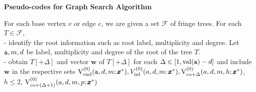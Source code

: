 \documentclass[12pt]{article}
\newcommand{\co}{\mathrm{co}}
\newcommand{\V}{{\rm V}}
\newcommand{\ta}{{\tt a}}
\newcommand{\w}{\pmb{w}}
\newcommand{\x}{\pmb{x}}
\newcommand{\1}{\pmb{1}}
\newcommand{\0}{\pmb{0}}
\newcommand{\val}{\mathrm{val}}
\newcommand{\inl}{\mathrm{inl}}
\newcommand{\en}{\mathrm{end}}
\begin{document}
  
 
\begin{center}
 {\Large\bf Pseudo-codes for Graph Search Algorithm}
\end{center} 
For each base vertex $v$ or edge $e$, we are given a set
$\mathcal{F}$ of fringe trees. 
For each $T \in \mathcal{F}$, \\
- identify the root information
such as root label, multiplicity and degree. 
Let $\ta, m, d$ be label, multiplicity and degree of the root of 
the tree $T$. \\
- obtain $T[+\Delta]$ and vector $\w$ of 
$T[+\Delta]$ 
for each $\Delta \in [1, \val(\ta) - d]$ and 
include $\w$ in the respective sets
$\V_{\en}^{(0)}(\ta, d, m; \x^*), V_{\inl}^{(0)}(a, d, m; \x^*), 
\V_{\co+\Delta}^{(0)}(a, d, m, h; \x^*)$, $h \leq 2$, 
$\V_{\co+(\Delta+1)}^{(0)}(a, d, m, p; \x^*)$


 

% 
% 
\end{document}
